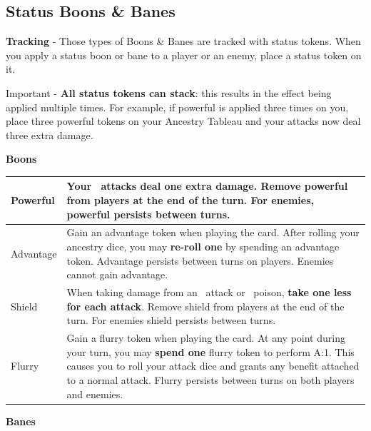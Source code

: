
\newpage

\subsection*{Status Boons \& Banes}
\textbf{Tracking} - Those types of Boons \& Banes are tracked with status tokens. When you apply a status boon or bane to a player or an enemy, place a status token on it.

\begin{tcolorbox}[colframe=red, colback=white]
	Important - \textbf{All status tokens can stack}: this results in the effect being applied multiple times.
	For example, if powerful is applied three times on you, place three powerful tokens on your Ancestry Tableau and your attacks now deal three extra damage.
\end{tcolorbox}

\textbf{Boons} 
\begin{longtable}{|p{2.5cm}|p{13.7cm}|}
	
	\hline
	Powerful \symPowerful & Your \symAttack~attacks deal \textbf{one extra damage}. Remove powerful from players at the end of the turn. For enemies, powerful persists between turns. \\
	\hline
	Advantage \symAdvantage & Gain an advantage token when playing the card. After rolling your ancestry dice, you may \textbf{re-roll one} by spending an advantage token.   Advantage persists between turns on players. Enemies cannot gain advantage.\\
	\hline
	Shield \symShield & When taking damage from an \symAttack~attack or \symPoison~poison, \textbf{take one less for each attack}. Remove shield from players at the end of the turn. For enemies shield persists between turns. \\
	\hline
	Flurry \symFlurry & Gain a flurry token when playing the card. At any point during your turn, you may \textbf{spend one} flurry token to perform \symAttack A:1. This causes you to roll your attack dice and grants any benefit attached to a normal attack. Flurry persists between turns on both players and enemies. \\
	\hline
		
\end{longtable}

\textbf{Banes} 

